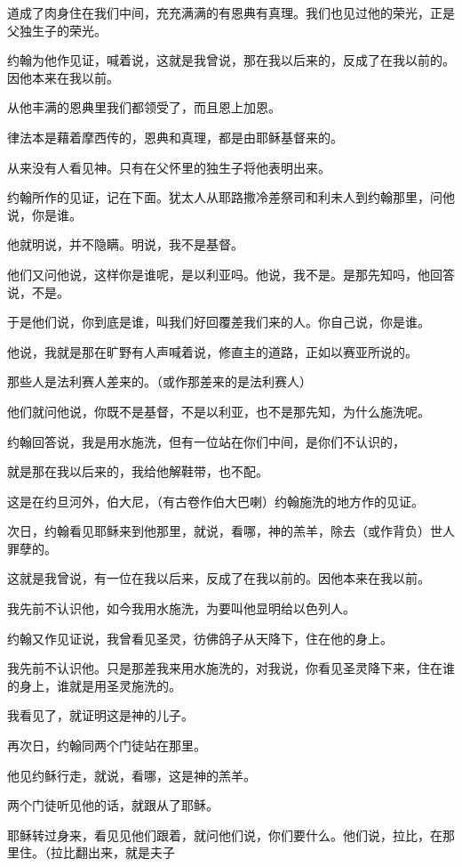 \documentclass[12pt,oneside]{book}
\begin{document}
道成了肉身住在我们中间，充充满满的有恩典有真理。我们也见过他的荣光，正是父独生子的荣光。

约翰为他作见证，喊着说，这就是我曾说，那在我以后来的，反成了在我以前的。因他本来在我以前。

从他丰满的恩典里我们都领受了，而且恩上加恩。

律法本是藉着摩西传的，恩典和真理，都是由耶稣基督来的。

从来没有人看见神。只有在父怀里的独生子将他表明出来。

约翰所作的见证，记在下面。犹太人从耶路撒冷差祭司和利未人到约翰那里，问他说，你是谁。

他就明说，并不隐瞒。明说，我不是基督。

他们又问他说，这样你是谁呢，是以利亚吗。他说，我不是。是那先知吗，他回答说，不是。

于是他们说，你到底是谁，叫我们好回覆差我们来的人。你自己说，你是谁。

他说，我就是那在旷野有人声喊着说，修直主的道路，正如以赛亚所说的。

那些人是法利赛人差来的。（或作那差来的是法利赛人）

他们就问他说，你既不是基督，不是以利亚，也不是那先知，为什么施洗呢。

约翰回答说，我是用水施洗，但有一位站在你们中间，是你们不认识的，

就是那在我以后来的，我给他解鞋带，也不配。

这是在约旦河外，伯大尼，（有古卷作伯大巴喇）约翰施洗的地方作的见证。

次日，约翰看见耶稣来到他那里，就说，看哪，神的羔羊，除去（或作背负）世人罪孽的。

这就是我曾说，有一位在我以后来，反成了在我以前的。因他本来在我以前。

我先前不认识他，如今我用水施洗，为要叫他显明给以色列人。

约翰又作见证说，我曾看见圣灵，彷佛鸽子从天降下，住在他的身上。

我先前不认识他。只是那差我来用水施洗的，对我说，你看见圣灵降下来，住在谁的身上，谁就是用圣灵施洗的。

我看见了，就证明这是神的儿子。

再次日，约翰同两个门徒站在那里。

他见约稣行走，就说，看哪，这是神的羔羊。

两个门徒听见他的话，就跟从了耶稣。

耶稣转过身来，看见见他们跟着，就问他们说，你们要什么。他们说，拉比，在那里住。（拉比翻出来，就是夫子
\end{document}
